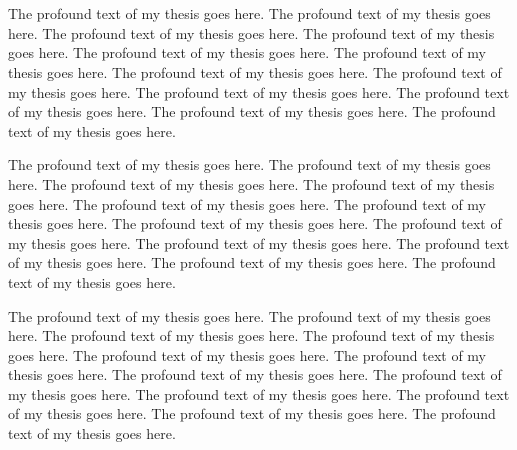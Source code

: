 \chapter{}\label{ch:three}

The profound text of my thesis goes here. The profound text of my thesis
goes here. The profound text of my thesis goes here. The profound text of my
thesis goes here. The profound text of my thesis goes here. The profound
text of my thesis goes here. The profound text of my thesis goes here. The
profound text of my thesis goes here. The profound text of my thesis goes
here. The profound text of my thesis goes here. The profound text of my
thesis goes here. The profound text of my thesis goes here.

The profound text of my thesis goes here. The profound text of my thesis
goes here. The profound text of my thesis goes here. The profound text of my
thesis goes here. The profound text of my thesis goes here. The profound
text of my thesis goes here. The profound text of my thesis goes here. The
profound text of my thesis goes here. The profound text of my thesis goes
here. The profound text of my thesis goes here. The profound text of my
thesis goes here. The profound text of my thesis goes here.

\begin{illustration}[H]
\centering
\vspace{\worddouble}   %
\caption{Placeholder for the first illustration}\label{ill:first}
\end{illustration}

The profound text of my thesis goes here. The profound text of my thesis
goes here. The profound text of my thesis goes here. The profound text of my
thesis goes here. The profound text of my thesis goes here. The profound
text of my thesis goes here. The profound text of my thesis goes here. The
profound text of my thesis goes here. The profound text of my thesis goes
here. The profound text of my thesis goes here. The profound text of my
thesis goes here. The profound text of my thesis goes here.
